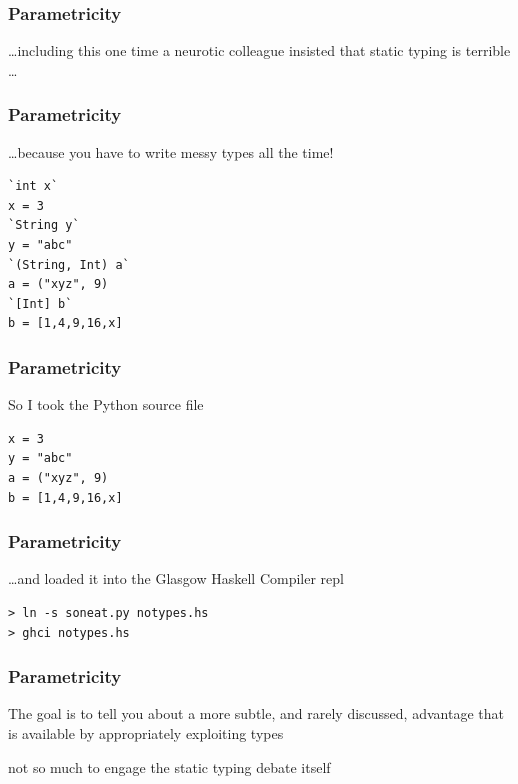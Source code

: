 {

\begin{frame}
\frametitle{Parametricity}
\begin{block}{\ldots including this one time}
a neurotic colleague insisted that static typing is terrible \ldots
\end{block}
\end{frame}


\begin{frame}[fragile]
\frametitle{Parametricity}
\ldots because you have to write messy types all the time!
\begin{lstlisting}[style=python,mathescape]
`int x`
x = 3
`String y`
y = "abc"
`(String, Int) a`
a = ("xyz", 9)
`[Int] b`
b = [1,4,9,16,x]
\end{lstlisting}
\end{frame}


\begin{frame}[fragile]
\frametitle{Parametricity}
So I took the Python source file
\begin{lstlisting}[style=python,mathescape]
x = 3
y = "abc"
a = ("xyz", 9)
b = [1,4,9,16,x]
\end{lstlisting}
\end{frame}


\begin{frame}[fragile]
\frametitle{Parametricity}
\ldots and loaded it into the Glasgow Haskell Compiler repl
\begin{lstlisting}
> ln -s soneat.py notypes.hs
> ghci notypes.hs
\end{lstlisting}
\end{frame}

}


\begin{frame}
\frametitle{Parametricity}
\begin{block}{The goal is to tell you about}
a more subtle, and rarely discussed, advantage that is available by appropriately exploiting types
\end{block}
\tiny{not so much to engage the static typing debate itself}
\end{frame}


